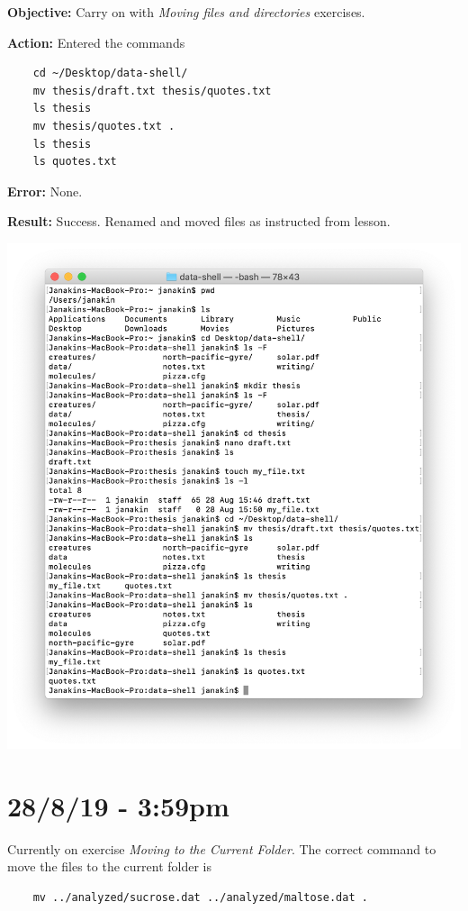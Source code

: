 \documentclass{article}
\begin{document}
\textbf{Objective:} Carry on with \textit{Moving files and directories} exercises.

\textbf{Action:} Entered the commands
\begin{verbatim}
    cd ~/Desktop/data-shell/
    mv thesis/draft.txt thesis/quotes.txt
    ls thesis
    mv thesis/quotes.txt .
    ls thesis
    ls quotes.txt
\end{verbatim}

\textbf{Error:} None.

\textbf{Result:} Success. Renamed and moved files as instructed from lesson.

\includegraphics[width=\textwidth]{figh.png}

\section*{28/8/19 - 3:59pm}

Currently on exercise \textit{Moving to the Current Folder}. The correct command to move the files to the current folder is \begin{verbatim}
    mv ../analyzed/sucrose.dat ../analyzed/maltose.dat .
\end{verbatim}
\end{document}
